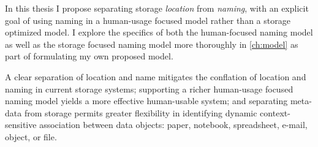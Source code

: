 In this thesis I propose separating storage \emph{location} from \emph{naming},
with an explicit goal of using naming in a human-usage focused model rather than
a storage optimized model.  I explore the specifics of both the human-focused
naming model as well as the storage focused naming model more thoroughly in
\autoref{ch:model} as part of formulating my own proposed model.

A clear separation of location and name mitigates the conflation of location and
naming in current storage systems; supporting a richer human-usage focused naming model
yields a more effective human-usable system; and separating meta-data from
storage permits greater flexibility in identifying dynamic context-sensitive
association between data objects:
paper, notebook, spreadsheet, e-mail, object, or file.


\endinput

Any text after an \endinput is ignored.
